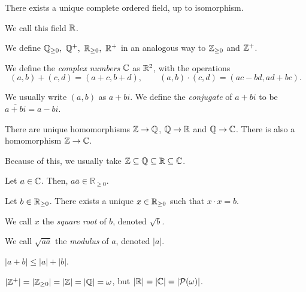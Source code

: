   \begin{thm}
    There exists a unique complete ordered field, up to isomorphism.
  \end{thm}
  \begin{defn}
    We call this field $\mathbb{R}$.
  \end{defn}
  \begin{defn}
    We define $\mathbb{Q}_{\ge 0},\ \mathbb{Q}^+,\ \mathbb{R}_{\ge 0},\ \mathbb{R}^+$ in an analogous way to
    $\mathbb{Z}_{\ge 0}$ and $\mathbb{Z}^+$.
  \end{defn}
  \begin{defn}
    We define the \emph{complex numbers} $\mathbb{C}$ as $\mathbb{R}^2$, with the operations
    \[(a,b)+(c,d)=(a+c,b+d),\qquad (a,b)\cdot(c,d)=(ac-bd,ad+bc).\]

    We usually write $(a,b)$ as $a+bi$. We define the \emph{conjugate} of $a+bi$
    to be $\overline{a+bi}=a-bi$.
  \end{defn}
  \begin{prop}
    There are unique homomorphisms $\mathbb{Z}\to\mathbb{Q}$, $\mathbb{Q}\to\mathbb{R}$ and $\mathbb{Q}\to\mathbb{C}$.
    There is also a homomorphism $\mathbb{Z}\to\mathbb{C}$.
  \end{prop}
  \begin{rem}
    Because of this, we usually take $\mathbb{Z}\subseteq\mathbb{Q}\subseteq\mathbb{R}\subseteq\mathbb{C}$.
  \end{rem}
  \begin{prop}
    Let $a\in\mathbb{C}$. Then, $a\overline{a}\in\mathbb R_{\ge 0}$.
  \end{prop}
  \begin{prop}
    Let $b\in\mathbb{R}_{\ge 0}$. There exists a unique $x\in\mathbb{R}_{\ge 0}$ such that
    $x\cdot x=b$. 
  \end{prop}
  \begin{defn}
    We call $x$ the \emph{square root} of $b$, denoted $\sqrt b$.

    We call $\sqrt{a\overline a}$ the \emph{modulus} of $a$, denoted $|a|$.
  \end{defn}
  \begin{prop}
    $|a+b|\le|a|+|b|$.
  \end{prop}
  \begin{thm}
    $|\mathbb{Z}^+|=|\mathbb{Z}_{\ge 0}|=|\mathbb{Z}|=|\mathbb{Q}|=\omega$, but $|\mathbb{R}|=|\mathbb{C}|=|\mathcal
    P(\omega)|$.
  \end{thm}
